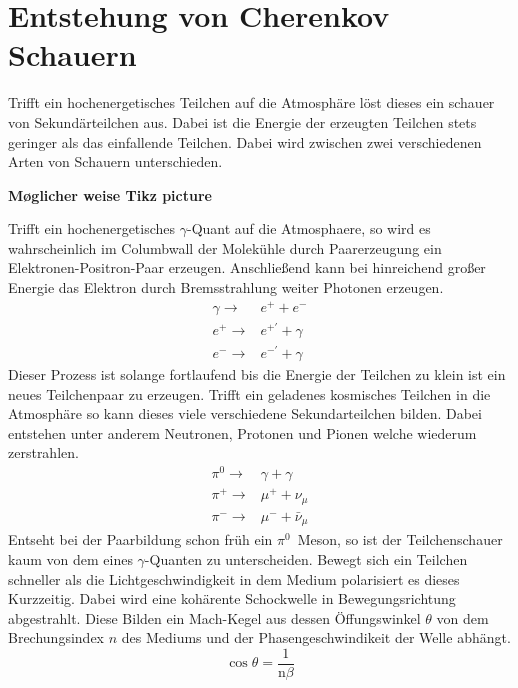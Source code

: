 \section{Entstehung von Cherenkov Schauern}
Trifft ein hochenergetisches Teilchen auf die Atmosphäre löst dieses ein schauer von Sekundärteilchen aus. Dabei ist die Energie der erzeugten Teilchen stets geringer als das einfallende Teilchen. Dabei wird zwischen zwei verschiedenen Arten von Schauern unterschieden. 

\textbf{Møglicher weise Tikz picture}

Trifft ein hochenergetisches $\gamma$-Quant auf die Atmosphaere, so wird es wahrscheinlich im Columbwall der Molekühle durch Paarerzeugung ein Elektronen-Positron-Paar erzeugen. 
Anschließend kann bei hinreichend großer Energie das Elektron durch Bremsstrahlung weiter Photonen erzeugen. 
\begin{eqnarray}
  \gamma \rightarrow& e^{+} + e^{-} \\
  e^{+} \rightarrow& e^{+'} + \gamma \\
  e^{-} \rightarrow& e^{-'} + \gamma 
\end{eqnarray}
Dieser Prozess ist solange fortlaufend bis die Energie der Teilchen zu klein ist ein neues Teilchenpaar zu erzeugen. 
Trifft ein geladenes kosmisches Teilchen in die Atmosphäre so kann dieses viele verschiedene Sekundarteilchen bilden. 
Dabei entstehen unter anderem Neutronen, Protonen und Pionen welche wiederum zerstrahlen. 
\begin{eqnarray}
  \pi^{0} \rightarrow& \gamma + \gamma \\
  \pi^{+} \rightarrow& \mu^{+} + \nu_{\mu} \\
  \pi^{-} \rightarrow& \mu^{-} + \bar{\nu}_{\mu}
\end{eqnarray}
Entseht bei der Paarbildung schon früh ein $\pi^{0}$~Meson, so ist der Teilchenschauer kaum von dem eines $\gamma$-Quanten zu unterscheiden. 
 Bewegt sich ein Teilchen schneller als die Lichtgeschwindigkeit in dem Medium polarisiert es dieses Kurzzeitig. 
Dabei wird eine kohärente Schockwelle in Bewegungsrichtung abgestrahlt. Diese Bilden ein Mach-Kegel aus dessen Öffungswinkel $\theta$ von dem Brechungsindex $n$ des Mediums und der Phasengeschwindikeit der Welle abhängt.
\begin{equation}
  \cos  \theta = \frac{1}{\text{n} \beta}
\end{equation}

